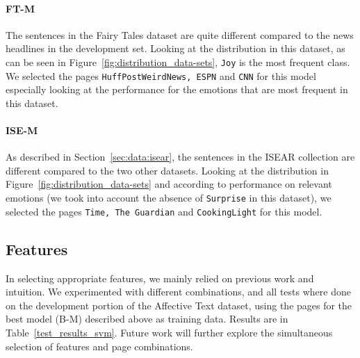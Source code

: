 \documentclass[11pt]{article}
\begin{document}

\paragraph{FT-M}
The sentences in the Fairy Tales dataset are quite different compared to the news headlines in the development set. Looking at the distribution in this dataset, as can be seen in Figure~\ref{fig:distribution_data-sets}, \texttt{Joy} is the most frequent class. We selected the pages \texttt{HuffPostWeirdNews, ESPN} and \texttt{CNN} for this model especially looking at the performance for the emotions that are most frequent in this dataset.



\paragraph{ISE-M}
As described in Section~\ref{sec:data:isear}, the sentences in the ISEAR collection are different compared to the two other datasets. Looking at the distribution in Figure~\ref{fig:distribution_data-sets} and according to performance on relevant emotions (we took into account the absence of \texttt{Surprise} in this dataset), we selected the pages \texttt{Time, The Guardian} and \texttt{CookingLight} for this model. 


\subsection{Features}
In selecting appropriate features, we mainly relied on previous work and intuition. We experimented with different combinations, and all tests where done on the development portion of the Affective Text dataset, using the pages for the best model (B-M) described above as training data. %
Results are in Table~\ref{test_results_svm}.
Future work will further explore the simultaneous selection of features and page combinations.


\end{document}
